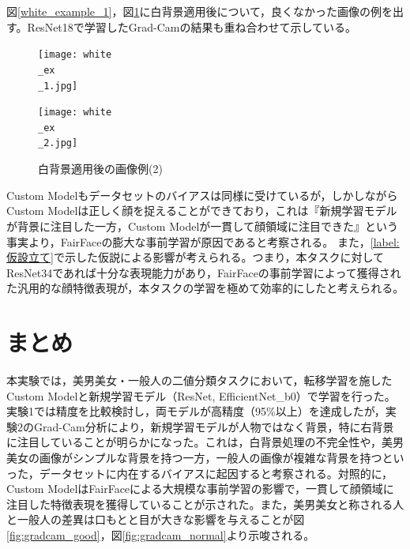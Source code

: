 \documentclass[a4paper,11pt,titlepage]{jsarticle}
\begin{document}
図\ref{white_example_1}，図\ref{white_example_2}に白背景適用後について，良くなかった画像の例を出す。ResNet18で学習したGrad-Camの結果も重ね合わせて示している。
\begin{figure}[H]
  \centering
  \begin{minipage}[b]{0.48\linewidth}
    \centering
    \texttt{[image: white\\\_ex\\\_1.jpg]}
    \caption{白背景適用後の画像例(1)}  
    \label{white_example_1}
  \end{minipage}
  \hfill
  \begin{minipage}[b]{0.48\linewidth}
    \centering
    \texttt{[image: white\\\_ex\\\_2.jpg]}
     \caption{白背景適用後の画像例(2)}   
    \label{white_example_2}
  \end{minipage}
\end{figure}


Custom Modelもデータセットのバイアスは同様に受けているが，しかしながらCustom Modelは正しく顔を捉えることができており，これは『新規学習モデルが背景に注目した一方，Custom Modelが一貫して顔領域に注目できた』という事実より，FairFaceの膨大な事前学習が原因であると考察される。
また，\ref{label:仮設立て}で示した仮説による影響が考えられる。つまり，本タスクに対してResNet34であれば十分な表現能力があり，FairFaceの事前学習によって獲得された汎用的な顔特徴表現が，本タスクの学習を極めて効率的にしたと考えられる。



\section{まとめ}
\label{label:まとめ}

本実験では，美男美女・一般人の二値分類タスクにおいて，転移学習を施したCustom Modelと新規学習モデル（ResNet, EfficientNet\_b0）で学習を行った。実験1では精度を比較検討し，両モデルが高精度（95\%以上）を達成したが，実験2のGrad-Cam分析により，新規学習モデルが人物ではなく背景，特に右背景に注目していることが明らかになった。これは，白背景処理の不完全性や，美男美女の画像がシンプルな背景を持つ一方，一般人の画像が複雑な背景を持つといった，データセットに内在するバイアスに起因すると考察される。対照的に，Custom ModelはFairFaceによる大規模な事前学習の影響で，一貫して顔領域に注目した特徴表現を獲得していることが示された。また，美男美女と称される人と一般人の差異は口もとと目が大きな影響を与えることが図\ref{fig:gradcam_good}，図\ref{fig:gradcam_normal}より示唆される。\par
\end{document}
